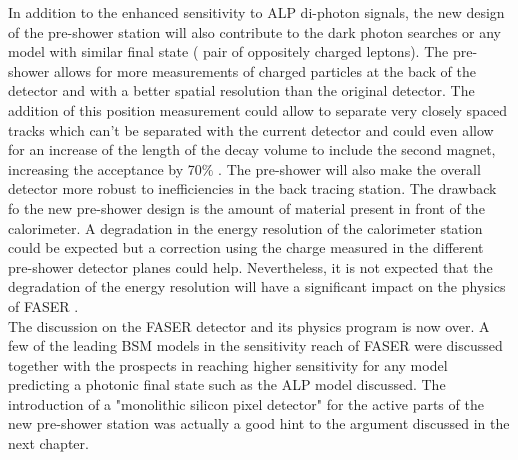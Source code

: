 		In addition to the enhanced sensitivity to ALP di-photon signals, the new design of the pre-shower station will also contribute to the dark photon searches or any model with similar final state ( pair of oppositely charged leptons). The pre-shower allows for more measurements of charged particles at the back of the detector and with a better spatial resolution than the original detector. The addition of this position measurement could allow to separate very closely spaced tracks which can't be separated with the current detector and could even allow for an increase of the length of the decay volume to include the second magnet, increasing the acceptance by 70$\%$ \cite{PreShower_TP}. The pre-shower will also make the overall detector more robust to inefficiencies in the back tracing station. 
		The drawback fo the new pre-shower design is the amount of material present in front of the calorimeter. A degradation in the energy resolution of the calorimeter station could be expected but a correction using the charge measured in the different pre-shower detector planes could help. Nevertheless, it is not expected that the degradation of the energy resolution will have a significant impact on the physics of FASER \cite{PreShower_TP}.\\
		
		The discussion on the FASER detector and its physics program is now over. A few of the leading BSM models in the sensitivity reach of FASER were discussed together with the prospects in reaching higher sensitivity for any model predicting a photonic final state such as the ALP model discussed. The introduction of a "monolithic silicon pixel detector" for the active parts of the new pre-shower station was actually a good hint to the argument discussed in the next chapter. 
		


		
		
		
		
		
		
		
		
		
		
		
		
		
		
		
		
		
		